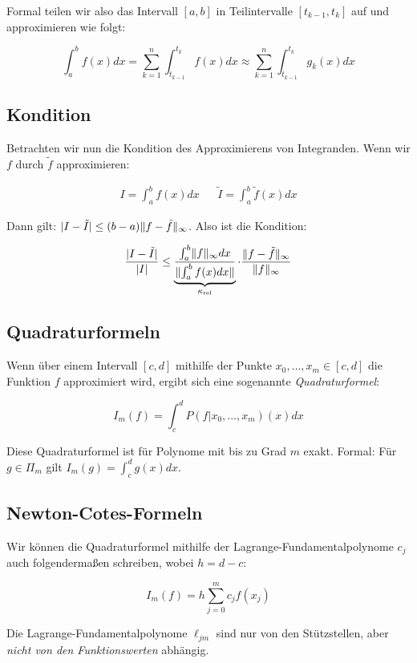 \documentclass[a4paper,parskip=half*,DIV=7,fontsize=11pt]{scrartcl}
\DeclarePairedDelimiter\abs{\lvert}{\rvert}
\DeclarePairedDelimiter\norm{\lVert}{\rVert}
\begin{document}
Formal teilen wir also das Intervall $[a, b]$ in Teilintervalle $[t_{k-1}, t_k]$ auf und approximieren wie folgt:

\[
	\int_a^b f(x) dx = \sum_{k=1}^n \int_{t_{k-1}}^{t_k} f(x) dx \approx \sum_{k=1}^n \int_{t_{k-1}}^{t_k} g_k(x)dx
\]

\subsection{Kondition}

Betrachten wir nun die Kondition des Approximierens von Integranden. Wenn wir $f$ durch $\tilde{f}$ approximieren:

\begin{align*}
	I = \int_a^b f(x) dx & & \tilde{I} = \int_a^b \tilde{f}(x) dx
\end{align*}

Dann gilt: $\abs{I - \tilde{I}} \leq (b - a) \norm{f - \tilde{f}}_\infty$. Also ist die Kondition:

\[
  \frac{\abs{I - \tilde{I}}}{\abs{I}} \leq \underbrace{\frac{\int_a^b \norm{f}_\infty dx}{\norm{\int_a^b f(x) dx}}}_{\kappa_\mathrm{rel}} \cdot \frac{\norm{f - \tilde{f}}_\infty}{\norm{f}_\infty}
\]

\subsection{Quadraturformeln}

Wenn über einem Intervall $[c, d]$ mithilfe der Punkte $x_0, \ldots, x_m \in [c, d]$ die Funktion $f$ approximiert wird, ergibt sich eine sogenannte \emph{Quadraturformel}:

\[
  I_m(f) = \int_c^d P(f \vert x_0, \ldots, x_m)(x) dx
\]

Diese Quadraturformel ist für Polynome mit bis zu Grad $m$ exakt. Formal: Für $g \in \Pi_m$ gilt $I_m(g) = \int_c^d g(x) dx$.

\subsection{Newton-Cotes-Formeln}

Wir können die Quadraturformel mithilfe der Lagrange-Fundamentalpolynome $c_j$ auch folgendermaßen schreiben, wobei $h = d - c$:

\[
  I_m(f) = h \sum_{j=0}^m c_j f(x_j)
\]

Die Lagrange-Fundamentalpolynome $\ell_{jm}$ sind nur von den Stützstellen, aber \emph{nicht von den Funktionswerten} abhängig.
\end{document}
